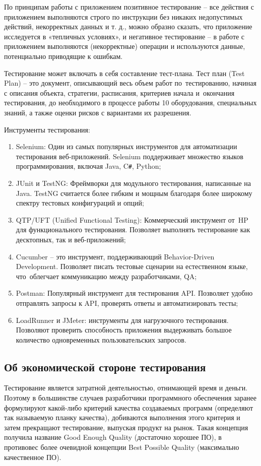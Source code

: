 \documentclass{ou}
\begin{document}
По принципам работы с приложением позитивное тестирование -- все действия с приложением выполняются строго по инструкции без никаких недопустимых действий, некорректных данных и т. д., можно образно сказать, что приложение исследуется в «тепличных условиях», и негативное тестирование -- в работе с приложением выполняются (некорректные) операции и используются данные, потенциально приводящие к ошибкам.

Тестирование может включать в себя составление тест-плана. Тест план (Test Plan) -- это документ, описывающий весь объем работ по~тестированию, начиная с описания объекта, стратегии, расписания, критериев начала и~окончания тестирования, до необходимого в процессе работы 10 оборудования, специальных знаний, а также оценки рисков с вариантами их разрешения.

Инструменты тестирования:
\begin{enumerate}[leftmargin=0em, itemindent=3.75em, nosep, label=\arabic*)]
\item Selenium: Один из самых популярных инструментов для автоматизации тестирования веб-приложений. Selenium поддерживает множество языков программирования, включая Java, C\verb|#|, Python;
\item JUnit и TestNG: Фреймворки для модульного тестирования, написанные на Java. TestNG считается более гибким и мощным благодаря более широкому спектру тестовых конфигураций и опций;
\item QTP/UFT (Unified Functional Testing): Коммерческий инструмент от~HP для функционального тестирования. Позволяет выполнять тестирование как десктопных, так и веб-приложений;
\item Cucumber -- это инструмент, поддерживающий Behavior-Driven Development. Позволяет писать тестовые сценарии на естественном языке, что~облегчает коммуникацию между разработчиками, QA;
\item Postman: Популярный инструмент для тестирования API. Позволяет удобно отправлять запросы к API, проверять ответы и автоматизировать тесты;
\item LoadRunner и JMeter: инструменты для нагрузочного тестирования. Позволяют проверить способность приложения выдерживать большое количество одновременных пользовательских запросов.
\end{enumerate}
\subsection{Об экономической стороне тестирования}
Тестирование является затратной деятельностью, отнимающей время и деньги. Поэтому в большинстве случаев разработчики программного обеспечения заранее формулируют какой-либо критерий качества создаваемых программ (определяют так называемую планку качества), добиваются выполнения этого критерия и затем прекращают тестирование, выпуская продукт на рынок. Такая концепция получила название Good Enough Quality (достаточно хорошее ПО), в противовес более очевидной концепции Best Possible Quality (максимально качественное ПО).
\end{document}
